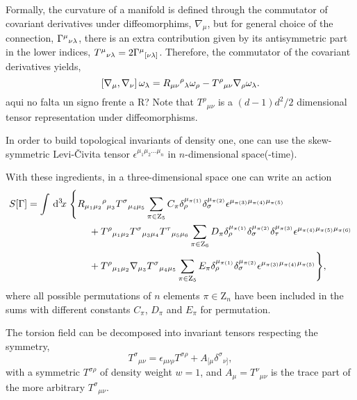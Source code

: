 \documentclass[twocolumn,
  showpacs,showkeys,prd,superscriptaddress]{revtex4-1}
\begin{document}
Formally, the curvature of a manifold is defined through the commutator of covariant derivatives under diffeomorphims, $\nabla_\mu$, but for general choice of the connection, $\Gamma^\mu{}_{\nu\lambda}$, there is an extra contribution given by its antisymmetric part in the lower indices, $T^\mu{}_{\nu\lambda}=2\Gamma^\mu{}_{[\nu\lambda]}$. Therefore, the commutator of the covariant derivatives yields,
\begin{equation}
  \left[\nabla_{{\mu}},\nabla_{{\nu}}\right]\omega_\lambda = R_{\mu\nu}{}^\rho{}_\lambda \omega _\rho - T^\rho{}_{\mu\nu}\nabla_{{\rho}}\omega_\lambda.\label{curvdef}
\end{equation}{\color{red}aqui no falta un signo frente a R?}
Note that $T^\rho{}_{\mu\nu}$ is a $(d-1)d^2/2$ dimensional tensor representation under diffeomorphisms.

In order to build topological invariants of density one, one can use the skew-symmetric Levi-\v{C}ivita tensor $\epsilon^{\mu_1\mu_2\dots\mu_n}$ in $n$-dimensional space(-time).

\begin{widetext}
  With these ingredients, in a three-dimensional space one can write an action 
  \begin{equation}
    \label{accion3d}
    \begin{split}      
      S[\Gamma] =
      \int \,{\mathrm{d}}^{3}\!{x}\; & \Bigg\{R_{\mu_1\mu_2}{}^\rho{}_{\mu_3} T^\sigma{}_{\mu_4\mu_5}\sum_{\pi \in  \mathrm{Z}_5}C_\pi\delta_\rho^{\mu_{\pi(1)}} \delta_\sigma^{\mu_{\pi(2)}}\epsilon^{\mu_{\pi(3)}\mu_{\pi(4)}\mu_{\pi(5)}} \\ 
      & \qquad + T^\rho{}_{\mu_1\mu_2} T^\sigma{}_{\mu_3\mu_4}T^\tau{}_{\mu_5\mu_6} \sum_{\pi \in \mathrm{Z}_6}D_\pi\delta_\rho^{\mu_{\pi(1)}} \delta_\sigma^{\mu_{\pi(2)}}\delta_\tau^{\mu_{\pi(3)}}\epsilon^{\mu_{\pi(4)}\mu_{\pi(5)}\mu_{\pi(6)}} \\
      & \qquad  +T^\rho{}_{\mu_1\mu_2}\nabla_{\mu_3} T^\sigma{}_{\mu_4\mu_5}\sum_{\pi \in \mathrm Z_5}E_\pi\delta_\rho^{\mu_{\pi(1)}} \delta_\sigma^{\mu_{\pi(2)}}\epsilon^{\mu_{\pi(3)}\mu_{\pi(4)}\mu_{\pi(5)}} \Bigg\}, 
    \end{split}
  \end{equation}
  where all possible permutations of $n$ elements $\pi\in\mathrm{Z}_n$ have been included in the sums with  different constants $C_\pi$, $D_\pi$ and $E_\pi$ for  permutation. 
\end{widetext}

The torsion field can be decomposed into invariant tensors respecting the symmetry,
\begin{equation}
  T^\sigma{}_{\mu\nu}=\epsilon_{\mu\nu\rho} T^{\sigma\rho}+A_{[\mu}\delta^\sigma{}_{\nu]},
\end{equation}
with a symmetric $T^{\sigma\rho}$ of density weight  $w =1$, and \mbox{$A_\mu=T^\nu{}_{\mu\nu}$} is the trace part of the more arbitrary $T^\sigma{}_{\mu\nu}$.
\end{document}
